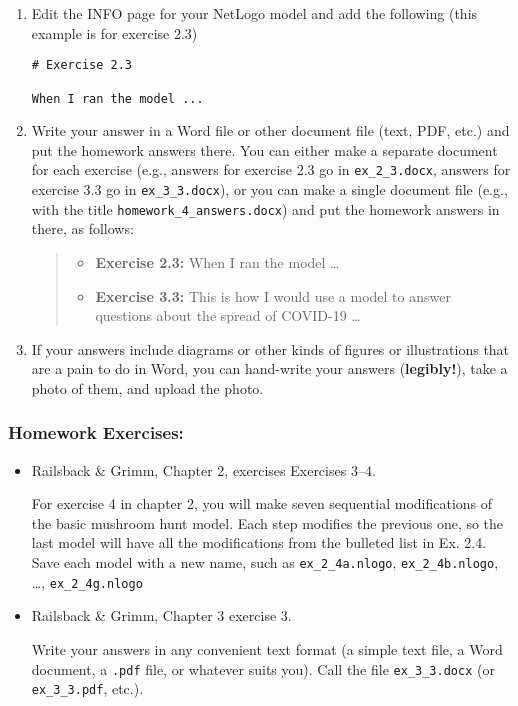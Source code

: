 \documentclass[
]{article}
\providecommand{\tightlist}{%
  \setlength{\itemsep}{0pt}\setlength{\parskip}{0pt}}
\begin{document}
\begin{enumerate}
\def\labelenumi{\arabic{enumi}.}
\item
  Edit the INFO page for your NetLogo model and add the following (this
  example is for exercise 2.3)

\begin{verbatim}
# Exercise 2.3

When I ran the model ...
\end{verbatim}
\item
  Write your answer in a Word file or other document file (text, PDF,
  etc.) and put the homework answers there. You can either make a
  separate document for each exercise (e.g., answers for exercise 2.3 go
  in \texttt{ex\_2\_3.docx}, answers for exercise 3.3 go in
  \texttt{ex\_3\_3.docx}), or you can make a single document file (e.g.,
  with the title \texttt{homework\_4\_answers.docx}) and put the
  homework answers in there, as follows:

  \begin{quote}
  \begin{itemize}
  \tightlist
  \item
    \textbf{Exercise 2.3:} When I ran the model \ldots{}
  \item
    \textbf{Exercise 3.3:} This is how I would use a model to answer
    questions about the spread of COVID-19 \ldots{}
  \end{itemize}
  \end{quote}
\item
  If your answers include diagrams or other kinds of figures or
  illustrations that are a pain to do in Word, you can hand-write your
  answers (\textbf{legibly!}), take a photo of them, and upload the
  photo.
\end{enumerate}

\hypertarget{homework-exercises-3}{%
\subsubsection{Homework Exercises:}\label{homework-exercises-3}}

\begin{itemize}
\item
  Railsback \& Grimm, Chapter 2, exercises Exercises 3--4.

  For exercise 4 in chapter 2, you will make seven sequential
  modifications of the basic mushroom hunt model. Each step modifies the
  previous one, so the last model will have all the modifications from
  the bulleted list in Ex. 2.4. Save each model with a new name, such as
  \texttt{ex\_2\_4a.nlogo}, \texttt{ex\_2\_4b.nlogo}, \dots,
  \texttt{ex\_2\_4g.nlogo}
\item
  Railsback \& Grimm, Chapter 3 exercise 3.

  Write your answers in any convenient text format (a simple text file,
  a Word document, a \texttt{.pdf} file, or whatever suits you). Call
  the file \texttt{ex\_3\_3.docx} (or \texttt{ex\_3\_3.pdf}, etc.).
\end{itemize}
\end{document}
